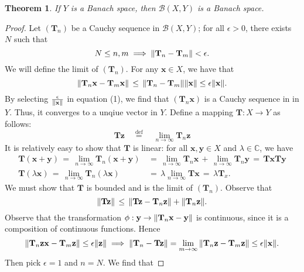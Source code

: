 \documentclass[11pt]{article}
\renewcommand{\vec}[1]{\mathbf{#1}}
\newcommand{\mat}[1]{\mathbf{#1}}
\newtheorem{theorem}{Theorem}
\begin{document}
\begin{theorem}
  If $Y$ is a Banach space, then $\mathcal{B}(X, Y)$ is a Banach space.
\end{theorem}
\begin{adjustwidth}{0.5cm}{}
  \begin{proof}
    Let $(\mat{T}_{n})$ be a Cauchy sequence in $\mathcal{B}(X, Y)$; for all $\epsilon > 0$, there exists $N$ such that
    \begin{equation}
      N \le n, m \implies \norm{\mat{T}_{n} - \mat{T}_{m}} < \epsilon.
    \end{equation}
    We will define the limit of $(\mat{T}_{n})$. For any $\vec{x} \in X$, we have that
    \[
      \norm{\mat{T}_{n} \vec{x} - \mat{T}_{m} \vec{x}} \, \le \, \norm{\mat{T}_{n} - \mat{T}_{m}} \norm{\vec{x}} \le \epsilon \norm{\vec{x}}.
    \]
    By selecting $\tfrac{\epsilon}{\norm{\vec{x}}}$ in equation (1), we find that $(\mat{T}_{n} \vec{x})$ is a Cauchy sequence in in $Y$. Thus, it converges to a unqiue vector in $Y$. Define a mapping $\mat{T} : X \to Y$ as follows:
    \[
      \mat{T} \vec{z} \quad \stackrel{\text{def}}{=} \quad \lim\limits_{n \to \infty} \mat{T}_{n} \vec{z}
    \]
    It is relatively easy to show that $\mat{T}$ is linear: for all $\vec{x}, \vec{y} \in X$ and $\lambda \in \mathbb{C}$, we have
    \begin{align*}
      \mat{T}(\vec{x} + \vec{y}) \, = \, \lim\limits_{n \to \infty} \mat{T}_{n}(\vec{x} + \vec{y}) \, &= \, \lim\limits_{n \to \infty} \mat{T}_{n} \vec{x} \, + \, \lim\limits_{n \to \infty} \mat{T}_{n} \vec{y} \, = \, \mat{T}\vec{x} \mat{T}\vec{y} \\
      \mat{T}(\lambda \vec{x}) \, = \, \lim\limits_{n \to \infty} \mat{T}_{n}(\lambda \vec{x}) \, &= \, \lambda \lim\limits_{n \to \infty} \mat{T} \vec{x} \, = \, \lambda \mat{T}_{x}.
    \end{align*}
    We must show that $\mat{T}$ is bounded and is the limit of $(\mat{T}_{n})$. Observe that 
    \[
      \norm{\mat{T} \vec{z}} \, \le \, \norm{\mat{T} \vec{z} - \mat{T}_{n} \vec{z}} + \norm{\mat{T}_{n} \vec{z}}.
    \]
    Observe that the transformation $\phi : \vec{y} \to \norm{\mat{T}_{n} \vec{x} - \vec{y}}$ is continuous, since it is a composition of continuous functions. Hence
    \[
      \norm{\mat{T}_{n}\vec{z} \vec{x} - \mat{T}_{m}\vec{z}} \le \epsilon \norm{\vec{z}} \implies \norm{\mat{T}_{n} - \mat{T}\vec{z}} = \lim\limits_{m \to \infty} \norm{\mat{T}_{n} \vec{z} - \mat{T}_{m} \vec{z}} \le \epsilon \norm{\vec{x}}.
    \]
    Then pick $\epsilon = 1$ and $n = N$. We find that

\end{proof}
\end{adjustwidth}
\end{document}
